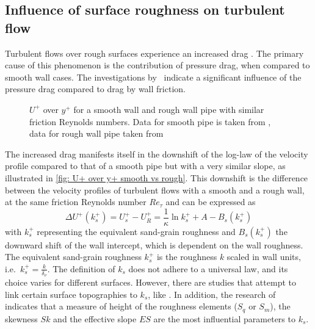 \subsection{Influence of surface roughness on turbulent flow}\label{subsec: Roughness influence on turbulent flow}
Turbulent flows over rough surfaces experience an increased drag \citep{chungPredictingDragRough2021}.
The primary cause of this phenomenon is the contribution of pressure drag, when compared to smooth wall cases.
The investigations by~\cite{macdonaldTurbulentFlowTransitionally2016} indicate a significant influence of the pressure drag compared to drag by wall friction.
\begin{figure}[h]
    \centering
    
    \caption[Mean velocity profiles $U^+$ over $y$ of rough and smooth pipe from reference data]{$U^+$ over $y^+$ for a smooth wall and rough wall pipe with similar friction Reynolds numbers. Data for smooth pipe is taken from \cite{yaoDirectNumericalSimulations2023}, data for rough wall pipe taken from \cite{demaioDirectNumericalSimulation2023}}
    \label{fig: U+ over y+ smooth vs rough}
\end{figure}
The increased drag manifests itself in the downshift of the log-law of the velocity profile compared to that of a smooth pipe but with a very similar slope, as illustrated in \autoref{fig: U+ over y+ smooth vs rough}.
This downshift is the difference between the velocity profiles of turbulent flows with a smooth and a rough wall, at the same friction Reynolds number $Re_{\tau}$ and can be expressed as
\begin{equation}
    \Delta U^+(k_s^+) = U_s^+ - U_R^+ = \frac{1}{\kappa}\ln{k_s^+} + A - B_s(k_s^+) 
\end{equation}
with $k_s^+$ representing the equivalent sand-grain roughness and $B_s(k_s^+)$ the downward shift of the wall intercept, which is dependent on the wall roughness.
The equivalent sand-grain roughness $k_s^+$ is the roughness $k$ scaled in wall units, i.e.\ $\displaystyle k_s^+ = \frac{k}{\delta_{\nu}}$.
The definition of $k_s$ does not adhere to a universal law, and its choice varies for different surfaces.
However, there are studies that attempt to link certain surface topographies to $k_s$, like \cite{flackReviewHydraulicRoughness2010}.
In addition, the research of~\cite{flackSkinFrictionMeasurements2020} indicates that a measure of height of the roughness elements ($S_q$ or $S_m$), the skewness $Sk$ and the effective slope $ES$ are the most influential parameters to $k_s$.

